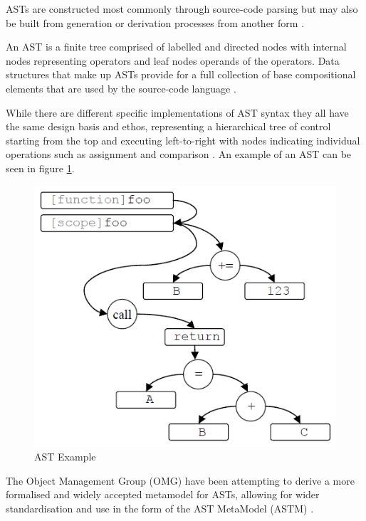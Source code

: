 ASTs are constructed most commonly through source-code parsing but may also be built from generation or derivation processes from another form \citep{omgastm}.

An AST is a finite tree comprised of labelled and directed nodes with internal nodes representing operators and leaf nodes operands of the operators. Data structures that make up ASTs provide for a full collection of base compositional elements that are used by the source-code language \citep{omgastm}.

While there are different specific implementations of AST syntax they all have the same design basis and ethos, representing a hierarchical tree of control starting from the top and executing left-to-right with nodes indicating individual operations such as assignment and comparison \citep{fischer2007abstract}. An example of an AST can be seen in figure \ref{fig-lit-reverseengineering-astexample}.

\begin{figure}[hbtp]
\centering
\includegraphics[scale=0.8]{sections/literature/reverseengineering/ast-example-misek}
\caption{AST Example \citep{misek2010mapping}}
\label{fig-lit-reverseengineering-astexample}
\end{figure}

The Object Management Group (OMG) have been attempting to derive a more formalised and widely accepted metamodel for ASTs, allowing for wider standardisation and use in the form of the AST MetaModel (ASTM) \citep{omgastm}.

